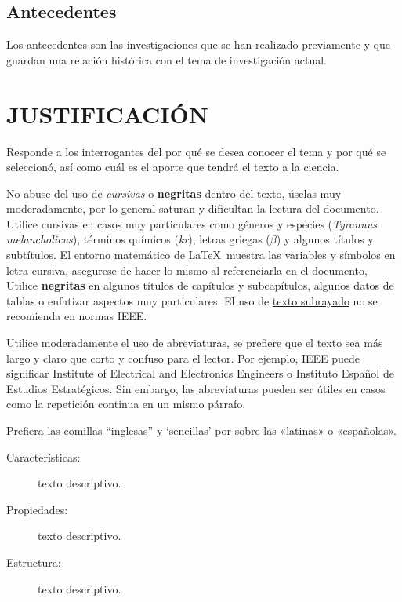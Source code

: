 \subsection{Antecedentes}

Los antecedentes son las investigaciones que se han realizado previamente y que guardan una relación histórica con el tema de investigación actual. 

\newpage


\section{JUSTIFICACIÓN}

Responde a los interrogantes del por qué se desea conocer el tema y por qué se seleccionó, así como cuál es el aporte que tendrá el texto a la ciencia. 

No abuse del uso de \textit{cursivas} o \textbf{negritas} dentro del texto, úselas muy moderadamente, por lo general saturan y dificultan la lectura del documento. Utilice cursivas en casos muy particulares como géneros y especies (\textit{Tyrannus melancholicus}), términos químicos (\textit{kr}), letras griegas ($\beta$) y algunos títulos y subtítulos. El entorno matemático de \LaTeX \ muestra las variables y símbolos en letra cursiva, asegurese de hacer lo mismo al referenciarla en el documento, Utilice \textbf{negritas} en algunos títulos de capítulos y subcapítulos, algunos datos de tablas o enfatizar aspectos muy particulares. El uso de \underline{texto subrayado} no se recomienda en normas IEEE.

Utilice moderadamente el uso de abreviaturas, se prefiere que el texto sea más largo y claro que corto y confuso para el lector. Por ejemplo, IEEE puede significar Institute of Electrical and Electronics Engineers o Instituto Español de Estudios Estratégicos. Sin embargo, las abreviaturas pueden ser útiles en casos como la repetición continua en un mismo párrafo.

Prefiera las comillas “inglesas” y ‘sencillas’ por sobre las «latinas» o «españolas».

\begin{description}
    \item[Características:] texto descriptivo.
    \item[Propiedades:] texto descriptivo.
    \item[Estructura:] texto descriptivo.
\end{description}

